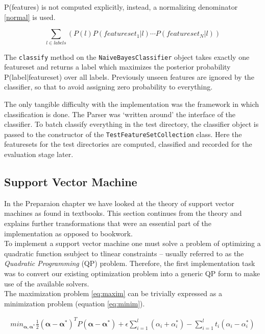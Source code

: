 \documentclass[12pt,twoside,notitlepage]{report}
\begin{document}
P(features) is not computed explicitly, instead, a normalizing denominator
\ref{normal} is used.

\begin{equation}
  \sum_{l \in labels}(P(l)P(featureset_1|l)\cdots P(featureset_N|l))
\end{equation}

The \texttt{classify} method on the \texttt{NaiveBayesClassifier} object takes
exactly one featureset and returns a label which maximizes the posterior
probability P(label|featureset) over all labels.
Previously unseen features are ignored by the classifier, so that to avoid
assigning zero probability to everything.

The only tangible difficulty with the implementation was the framework in which
classification is done. The Parser was `written around' the interface of the
classifier.
To batch classify everything in the test directory, the classifier object is
passed to the constructor of the \texttt{TestFeatureSetCollection} class. Here
the featuresets for the test directories are computed, classified and recorded
for the evaluation stage later.

\subsection{Support Vector Machine}
In the Preparaion chapter we have looked at the theory of support vector
machines as found in textbooks. This section continues from the theory and explains further
transformations that were an essential part of the implementation as opposed to
bookwork.\\
To implement a support vector machine one must solve a problem of optimizing a
quadratic function ssubject to tlinear constraints -- usually referred to as
the \textit{Quadratic Programming} (QP) problem. Therefore, the first
implementation task was to convert our existing optimization problem into a
generic QP form to make use of the available solvers.\\
The maximization problem \ref{eq:maxim} can be trivially expressed as a
minimization problem (equation \ref{eq:minim}).

\begin{gather}\label{eq:minim}
  min_{\bm{\alpha},\bm{\alpha^*}} \frac{1}{2}(\bm{\alpha-\alpha^*})^T P (\bm{\alpha - \alpha^*})+\epsilon 
\sum_{i=1}^{l}(\alpha_i+\alpha_i^*)-\sum_{i=1}^{l}t_i(\alpha_i-\alpha_i^*)
\end{gather}
\end{document}
